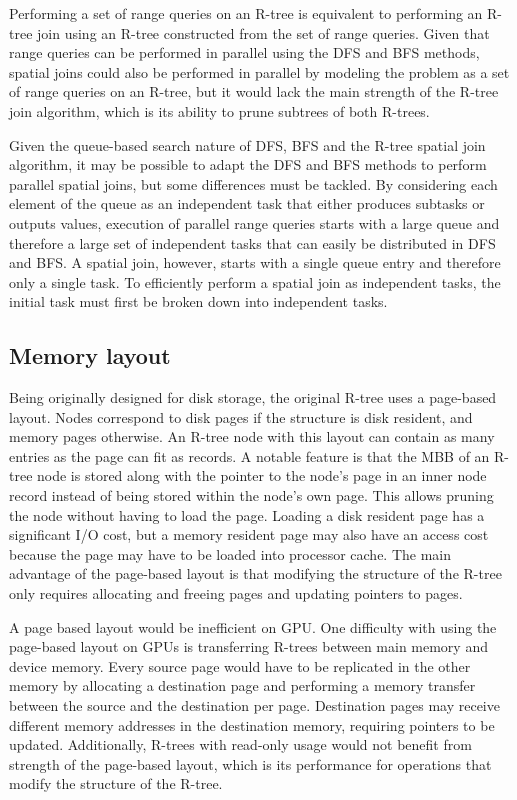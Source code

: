 Performing a set of range queries on an R-tree is equivalent to performing an R-tree join using an R-tree constructed from the set of range queries. Given that range queries can be performed in parallel using the DFS and BFS methods, spatial joins could also be performed in parallel by modeling the problem as a set of range queries on an R-tree, but it would lack the main strength of the R-tree join algorithm, which is its ability to prune subtrees of both R-trees.

Given the queue-based search nature of DFS, BFS and the R-tree spatial join algorithm, it may be possible to adapt the DFS and BFS methods to perform parallel spatial joins, but some differences must be tackled. By considering each element of the queue as an independent task that either produces subtasks or outputs values, execution of parallel range queries starts with a large queue and therefore a large set of independent tasks that can easily be distributed in DFS and BFS. A spatial join, however, starts with a single queue entry and therefore only a single task. To efficiently perform a spatial join as independent tasks, the initial task must first be broken down into independent tasks.

\subsection{Memory layout}

Being originally designed for disk storage, the original R-tree uses a page-based layout. Nodes correspond to disk pages if the structure is disk resident, and memory pages otherwise. An R-tree node with this layout can contain as many entries as the page can fit as records. A notable feature is that the MBB of an R-tree node is stored along with the pointer to the node's page in an inner node record instead of being stored within the node's own page. This allows pruning the node without having to load the page. Loading a disk resident page has a significant I/O cost, but a memory resident page may also have an access cost because the page may have to be loaded into processor cache. The main advantage of the page-based layout is that modifying the structure of the R-tree only requires allocating and freeing pages and updating pointers to pages.

A page based layout would be inefficient on GPU. One difficulty with using the page-based layout on GPUs is transferring R-trees between main memory and device memory. Every source page would have to be replicated in the other memory by allocating a destination page and performing a memory transfer between the source and the destination per page. Destination pages may receive different memory addresses in the destination memory, requiring pointers to be updated. Additionally, R-trees with read-only usage would not benefit from strength of the page-based layout, which is its performance for operations that modify the structure of the R-tree.


